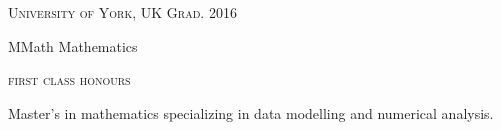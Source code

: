 \textsc{\small{University of York, UK
    \hfill
    {\raggedleft
        Grad. 2016
    }
}}

{\raggedright\large {
    MMath Mathematics
} \\}

\textsc{\small{first class honours}}

\normalsize{
    Master's in mathematics specializing in data modelling and numerical analysis.
} \\
